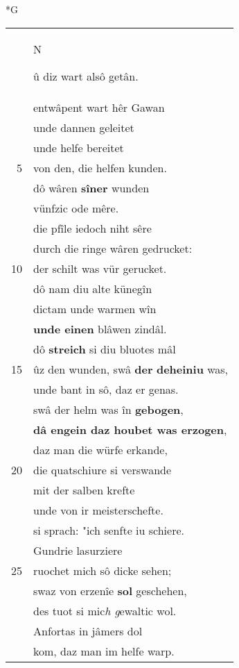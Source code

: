 \documentclass[8pt,a4paper,notitlepage]{article}
\begin{document}
\begin{table}[ht]
\begin{minipage}[t]{0.5\linewidth}
\small
\begin{center}*G
\end{center}
\begin{tabular}{rl}
 & \begin{large}N\end{large}û diz wart alsô getân.\\ 
 & entwâpent wart hêr Gawan\\ 
 & unde dannen geleitet\\ 
 & unde helfe bereitet\\ 
5 & von den, die helfen kunden.\\ 
 & dô wâren \textbf{sîner} wunden\\ 
 & vünfzic ode mêre.\\ 
 & die pfîle iedoch niht sêre\\ 
 & durch die ringe wâren gedrucket:\\ 
10 & der schilt was vür gerucket.\\ 
 & dô nam diu alte künegîn\\ 
 & dictam unde warmen wîn\\ 
 & \textbf{unde einen} blâwen zindâl.\\ 
 & dô \textbf{streich} si diu bluotes mâl\\ 
15 & ûz den wunden, swâ \textbf{der} \textbf{deheiniu} was,\\ 
 & unde bant in sô, daz er genas.\\ 
 & swâ der helm was în \textbf{gebogen},\\ 
 & \textbf{dâ engein daz houbet was erzogen},\\ 
 & daz man die würfe erkande,\\ 
20 & die quatschiure si verswande\\ 
 & mit der salben krefte\\ 
 & unde von ir meisterschefte.\\ 
 & si sprach: "ich senfte iu schiere.\\ 
 & Gundrie lasurziere\\ 
25 & ruochet mich sô dicke sehen;\\ 
 & swaz von erzenîe \textbf{sol} geschehen,\\ 
 & des tuot si mic\textit{h g}ewaltic wol.\\ 
 & Anfortas in jâmers dol\\ 
 & kom, daz man im helfe warp.\\ 

\end{tabular}
\end{minipage}
\end{table}
\end{document}
